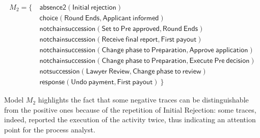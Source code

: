 \begin{align*}
M_2 = \{ \ &  \mathsf{ absence2(Initial\ rejection)} \\
& \mathsf{ choice(Round\ Ends, Applicant\ informed)} \\
& \mathsf{ notchainsuccession(Set\ to\ Pre\ approved, Round\ Ends)} \\
& \mathsf{ notchainsuccession(Receive\ final\ report, First\ payout)} \\
& \mathsf{ notchainsuccession(Change\ phase\ to\ Preparation, Approve\ application)} \\
& \mathsf{ notchainsuccession(Change\ phase\ to\ Preparation, Execute\ Pre\ decision)} \\
& \mathsf{ notsuccession(Lawyer\ Review, Change\ phase\ to\ review)} \\
& \mathsf{ response(Undo\ payment, First\ payout) } \ \} 
\end{align*}

Model $M_2$ %
highlights the fact that some negative traces can be distinguishable from the positive ones because of the repetition of \textsf{Initial Rejection}: some traces, indeed, reported the execution of the activity twice, thus indicating an attention point for the process analyst.



